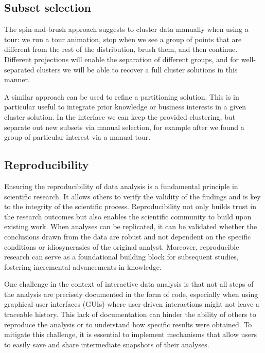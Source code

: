 \documentclass[article]{ajs}
\begin{document}

\subsection{Subset selection}

The spin-and-brush approach suggests to cluster data manually when using a tour: we run a tour animation, stop when we see a group of points that are different from the rest of the distribution, brush them, and then continue. Different projections will enable the separation of different groups, and for well-separated clusters we will be able to recover a full cluster solutions in this manner.

A similar approach can be used to refine a partitioning solution. This is in particular useful to integrate prior knowledge or business interests in a given cluster solution. In the interface we can keep the provided clustering, but separate out new subsets via manual selection, for example after we found a group of particular interest via a manual tour.

\subsection{Reproducibility}

Ensuring the reproducibility of data analysis is a fundamental principle in scientific research. It allows others to verify the validity of the findings and is key to the integrity of the scientific process. Reproducibility not only builds trust in the research outcomes but also enables the scientific community to build upon existing work. When analyses can be replicated, it can be validated whether the conclusions drawn from the data are robust and not dependent on the specific conditions or idiosyncrasies of the original analyst. Moreover, reproducible research can serve as a foundational building block for subsequent studies, fostering incremental advancements in knowledge.

One challenge in the context of interactive data analysis is that not all steps of the analysis are precisely documented in the form of code, especially when using graphical user interfaces (GUIs) where user-driven interactions might not leave a traceable history. This lack of documentation can hinder the ability of others to reproduce the analysis or to understand how specific results were obtained. To mitigate this challenge, it is essential to implement mechanisms that allow users to easily save and share intermediate snapshots of their analyses.
\end{document}
